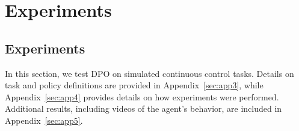 \chapter{Experiments}

\section{Experiments}\label{sec:exp}
In this section, we test DPO on simulated continuous control tasks. Details on task and policy definitions are provided in Appendix~\ref{sec:app3}, while Appendix~\ref{sec:app4} provides details on how experiments were performed. Additional results, including videos of the agent's behavior, are included in Appendix~\ref{sec:app5}.

